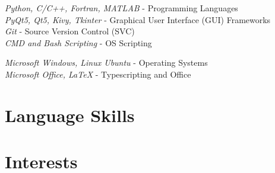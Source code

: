 \documentclass[10pt]{article} %
\begin{document}

{
\textit{Python, C/C++, Fortran, MATLAB} - Programming Languages\\
\textit{PyQt5, Qt5, Kivy, Tkinter} - Graphical User Interface (GUI) Frameworks\\
\textit{Git} - Source Version Control (SVC)\\
\textit{CMD and Bash Scripting} - OS Scripting
}


{
\textit{Microsoft Windows, Linux Ubuntu} - Operating Systems\\
\textit{Microsoft Office, \LaTeX} - Typescripting and Office
}


\section{Language Skills}




\section{Interests}


\end{document}

